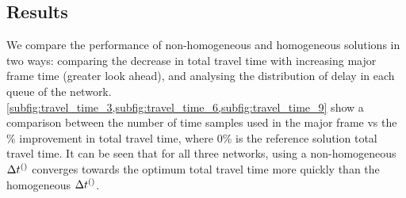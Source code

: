 
\subsection{Results}

We compare the performance of non-homogeneous and homogeneous solutions in two
ways: comparing the decrease in total travel time with increasing major frame
time (greater look ahead), and analysing the distribution of delay in each queue
of the network.
\cref{subfig:travel_time_3,subfig:travel_time_6,subfig:travel_time_9} show a
comparison between the number of time samples used in the major frame vs the
\% improvement in total travel time, where 0\% is the reference solution total
travel time. It can be seen that for all three networks, using a non-homogeneous
$\DT[]$ converges towards the optimum total travel time more quickly than the
homogeneous $\DT[]$. 

